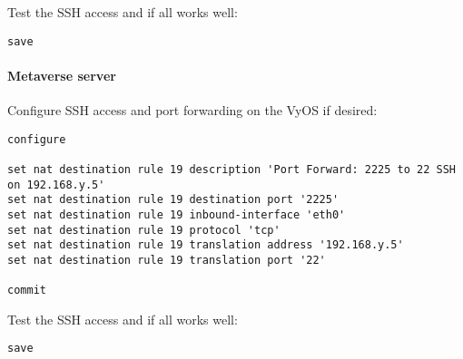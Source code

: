 Test the SSH access and if all works well:

\begin{verbatim}
save
\end{verbatim}

\hypertarget{metaverse-server}{%
\paragraph{Metaverse server}\label{metaverse-server}}

Configure SSH access and port forwarding on the VyOS if desired:

\begin{verbatim}
configure

set nat destination rule 19 description 'Port Forward: 2225 to 22 SSH on 192.168.y.5'
set nat destination rule 19 destination port '2225'
set nat destination rule 19 inbound-interface 'eth0'
set nat destination rule 19 protocol 'tcp'
set nat destination rule 19 translation address '192.168.y.5'
set nat destination rule 19 translation port '22'

commit
\end{verbatim}

Test the SSH access and if all works well:

\begin{verbatim}
save
\end{verbatim}
